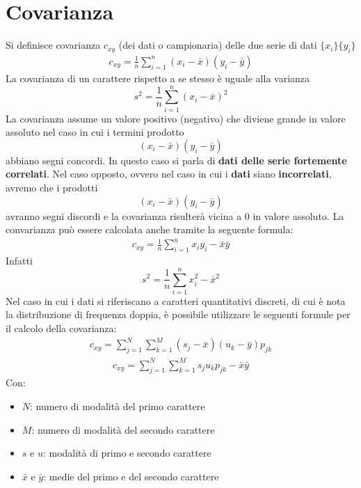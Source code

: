 \section{Covarianza}
Si definisce covarianza $c_{xy}$ (dei dati o campionaria) delle due serie di dati $ \{x_i\} \{y_i\} $
\begin{align}
	c_{xy} = \frac{1}{n} \sum_{i = 1}^{n}(x_i - \bar{x}) (y_i - \bar{y})
\end{align}
La covarianza di un carattere rispetto a se stesso è uguale alla varianza
\[ s^2 = \frac{1}{n} \sum_{i = 1}^{n} (x_i - \bar{x})^2 \]
La covarianza assume un valore positivo (negativo) che diviene grande in valore assoluto nel caso in cui i termini prodotto \[(x_i - \bar{x}) (y_i - \bar{y}) \]
abbiano segni concordi. \newline
In questo caso si parla di \textbf{dati delle serie fortemente correlati}. \newline
Nel caso opposto, ovvero nel caso in cui i \textbf{dati} siano \textbf{incorrelati}, avremo che i prodotti \[(x_i - \bar{x}) (y_i - \bar{y}) \] avranno segni discordi e la covarianza risulterà vicina a 0 in valore assoluto. \newline
La convarianza può essere calcolata anche tramite la seguente formula:
\begin{align}
c_{xy} = \frac{1}{n} \sum_{i = 1}^{n}x_i y_i - \bar{x} \bar{y}
\end{align}
Infatti
\[
s^2 = \frac{1}{n} \sum_{i = 1}^{n} x_i^2 - \bar{x}^2
\]
Nel caso in cui i dati si riferiscano a caratteri quantitativi discreti, di cui è nota la distribuzione di frequenza doppia, è possibile utilizzare le seguenti formule per il calcolo della covarianza:
\begin{align}
c_{xy} = \sum_{j = 1}^{N} \sum_{k = 1}^{M} (s_j - \bar{x}) (u_k - \bar{y})p_{jk}
\end{align}
\begin{align}
c_{xy} = \sum_{j = 1}^{N} \sum_{k = 1}^{M} s_j u_k p_{jk} - \bar{x} \bar{y}
\end{align}
Con:
\begin{itemize}
	\item $N$: numero di modalità del primo carattere
	\item $M$: numero di modalità del secondo carattere
	\item $s$ e $u$: modalità di primo e secondo carattere
	\item $\bar{x}$ e $\bar{y}$: medie del primo e del secondo carattere
\end{itemize}

